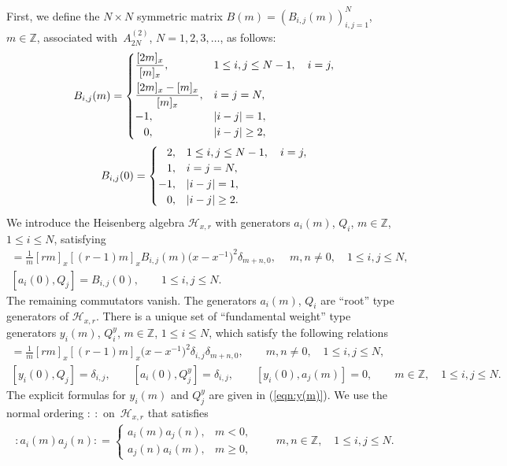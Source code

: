 \documentclass[10pt,a4paper]{amsart}
\numberwithin{equation}{section}
\begin{document}
First, we define the $N \times N$ symmetric matrix
$B(m)=(B_{i,j}(m))_{i,j=1}^N$, $m \in \mathbb{Z}$,
associated with~$A_{2N}^{(2)}$, $N=1,2,3, \dots$,
as follows:
\begin{gather*}
B_{i,j}(m)=
\begin{cases}
\dfrac{[2m]_x}{[m]_x},& 1\leq i, j \leq N-1,\quad i=j,
\\[2ex]
\dfrac{[2m]_x-[m]_x}{[m]_x}, & i=j=N,
\\
-1,& |i-j|=1,
\\
\hphantom{-}0,& |i-j|\geq 2,
\end{cases}
\\
B_{i,j}(0)=\begin{cases}
\hphantom{-}2,& 1\leq i, j \leq N-1,\quad  i=j,\\
\hphantom{-}1,& i=j=N,\\
-1,& {|i-j|=1,}\\
\hphantom{-}0,& |i-j|\geq 2.
\end{cases}
\end{gather*}
We introduce the Heisenberg algebra ${\mathcal H}_{x,r}$
with generators $a_i(m)$, $Q_i$, $m \in \mathbb{Z}$, $1\leq i \leq N$, satisfying
\begin{gather*}
[a_i(m),a_j(n)]=\frac{1}{m}[rm]_x[(r-1)m]_x
B_{i,j}(m)\big(x-x^{-1}\big)^2 \delta_{m+n,0},\quad\
m, n\neq 0, \quad 1\leq i, j \leq N,
\\
[a_i(0),Q_j]=B_{i,j}(0),\qquad 1\leq i,j \leq N.
\end{gather*}
The remaining commutators vanish. The generators $a_i(m)$, $Q_i$ are ``root'' type generators of
${\mathcal H}_{x,r}$. There is a unique set of ``fundamental weight'' type generators
$y_i(m)$, $Q_i^y$, $m \in \mathbb{Z}$, $1\leq i \leq N$, which
satisfy the following relations
\begin{gather*}
[y_i(m), a_j(n)]=\frac{1}{m}[rm]_x[(r-1)m]_x\big(x-x^{-1}\big)^2 \delta_{i,j} \delta_{m+n,0},\qquad
m, n \neq 0, \quad 1\leq i, j \leq N,
\\
[y_i(0),Q_j]=\delta_{i,j},\qquad
[a_i(0), Q_j^y]=\delta_{i,j},\qquad
[y_i(0),a_j(m)]=0,\qquad
m \in \mathbb{Z},\quad 1\leq i, j \leq N.
\end{gather*}
The explicit formulas for $y_i(m)$ and $Q_j^y$ are given in (\ref{eqn:y(m)}).
We use the normal ordering ${:}~{:}$ {on~${\mathcal H}_{x,r}$} that satisfies
\begin{gather*}
{:}a_i(m)a_j(n){:}= \begin{cases}
a_i(m)a_j(n),& m<0,
\\
a_j(n)a_i(m),& m \geq 0,
\end{cases} \qquad
m,n \in \mathbb{Z}, \quad 1\leq i, j \leq N.
\end{gather*}
\end{document}
